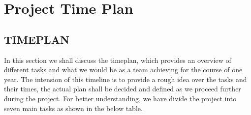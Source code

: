 \chapter{Project Time Plan}
\label{ch:Project Time Plan}

\section{TIMEPLAN}
In this section we shall discuss the timeplan, which provides an overview of different tasks and what we would be as a team achieving for the course of one year. The intension of this timeline is to provide a rough idea over the tasks and their times, the actual plan shall be decided and defined as we proceed further during the project. For better understanding, we have divide the project into seven main tasks as shown in the below table.

